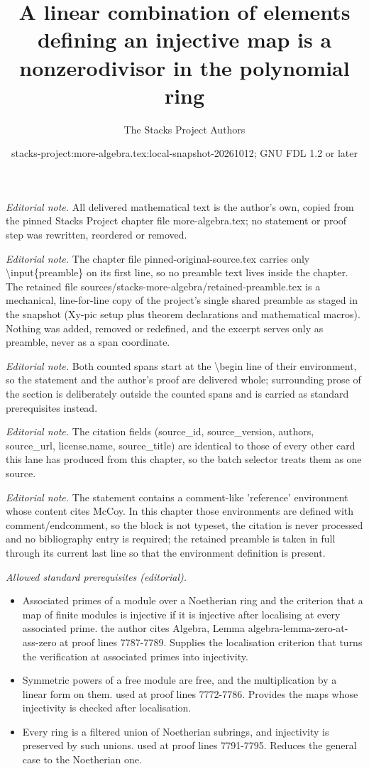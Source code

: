 \documentclass[10pt,a4paper]{amsart}
\title{A linear combination of elements defining an injective map is a nonzerodivisor in the polynomial ring}
\author{The Stacks Project Authors}
\date{stacks-project:more-algebra.tex:local-snapshot-20261012; GNU FDL 1.2 or later}
\theoremstyle{plain}
\theoremstyle{definition}
\theoremstyle{remark}
\numberwithin{equation}{subsection}
\begin{document}
\maketitle
\setcounter{subsection}{1}
\noindent\textit{Editorial note.} All delivered mathematical text is the author's own, copied from the pinned Stacks Project chapter file more-algebra.tex; no statement or proof step was rewritten, reordered or removed.\par\medskip
\noindent\textit{Editorial note.} The chapter file pinned-original-source.tex carries only \textbackslash{}input\{preamble\} on its first line, so no preamble text lives inside the chapter. The retained file sources/stacks-more-algebra/retained-preamble.tex is a mechanical, line-for-line copy of the project's single shared preamble as staged in the snapshot (Xy-pic setup plus theorem declarations and mathematical macros). Nothing was added, removed or redefined, and the excerpt serves only as preamble, never as a span coordinate.\par\medskip
\noindent\textit{Editorial note.} Both counted spans start at the \textbackslash{}begin line of their environment, so the statement and the author's proof are delivered whole; surrounding prose of the section is deliberately outside the counted spans and is carried as standard prerequisites instead.\par\medskip
\noindent\textit{Editorial note.} The citation fields (source\_id, source\_version, authors, source\_url, license.name, source\_title) are identical to those of every other card this lane has produced from this chapter, so the batch selector treats them as one source.\par\medskip
\noindent\textit{Editorial note.} The statement contains a comment-like 'reference' environment whose content cites McCoy. In this chapter those environments are defined with comment/endcomment, so the block is not typeset, the citation is never processed and no bibliography entry is required; the retained preamble is taken in full through its current last line so that the environment definition is present.\par\medskip
\noindent\textit{Allowed standard prerequisites (editorial).}\begin{itemize}
\item Associated primes of a module over a Noetherian ring and the criterion that a map of finite modules is injective if it is injective after localising at every associated prime. the author cites Algebra, Lemma algebra-lemma-zero-at-ass-zero at proof lines 7787-7789. Supplies the localisation criterion that turns the verification at associated primes into injectivity.
\item Symmetric powers of a free module are free, and the multiplication by a linear form on them. used at proof lines 7772-7786. Provides the maps whose injectivity is checked after localisation.
\item Every ring is a filtered union of Noetherian subrings, and injectivity is preserved by such unions. used at proof lines 7791-7795. Reduces the general case to the Noetherian one.
\end{itemize}\medskip
\end{document}
